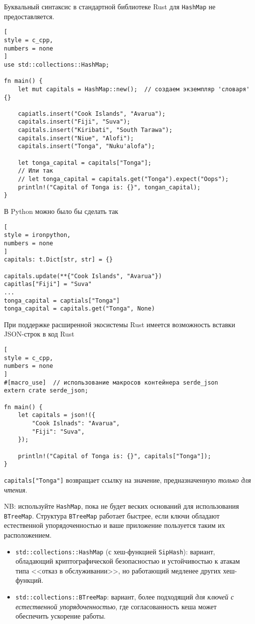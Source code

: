 \documentclass[%
	11pt,
	a4paper,
	utf8,
		]{article}
\begin{document}
Буквальный синтаксис в стандартной библиотеке Rust для \verb|HashMap| не предоставляется. 
\begin{lstlisting}[
style = c_cpp,
numbers = none	
]
use std::collections::HashMap;

fn main() {
    let mut capitals = HashMap::new();  // создаем экземпляр 'словаря' {}
    
    capiatls.insert("Cook Islands", "Avarua");
    capitals.insert("Fiji", "Suva");
    capitals.insert("Kiribati", "South Tarawa");
    capitals.insert("Niue", "Alofi");
    capitals.insert("Tonga", "Nuku'alofa");
    
    let tonga_capital = capitals["Tonga"];
    // Или так
    // let tonga_capital = capitals.get("Tonga").expect("Oops");
    println!("Capital of Tonga is: {}", tongan_capital);
}
\end{lstlisting}

В Python можно было бы сделать так
\begin{lstlisting}[
style = ironpython,
numbers = none
]
capitals: t.Dict[str, str] = {}

capitals.update(**{"Cook Islands", "Avarua"})
capitlas["Fiji"] = "Suva"
...
tonga_capital = captials["Tonga"]
tonga_capital = capitals.get("Tonga", None)
\end{lstlisting}

При поддержке расширенной экосистемы Rust имеется возможность вставки JSON-строк в код Rust
\begin{lstlisting}[
style = c_cpp,
numbers = none
]
#[macro_use]  // использование макросов контейнера serde_json
extern crate serde_json;

fn main() {
    let capitals = json!({
        "Cook Islnads": "Avarua",
        "Fiji": "Suva",
    });

    println!("Capital of Tonga is: {}", capitals["Tonga"]);
}
\end{lstlisting}

\verb|capitals["Tonga"]| возвращает ссылку на значение, предназначенную \emph{только для чтения}.

NB: используйте \verb|HashMap|, пока не будет веских оснований для использования \verb|BTreeMap|. Структура \verb|BTreeMap| работает быстрее, если ключи обладают естественной упорядоченностью и ваше приложение пользуется таким их расположением.

\begin{itemize}
	\item \verb|std::collections::HashMap| (с хеш-функцией \verb|SipHash|): вариант, обладающий криптографической безопасностью и устойчивостью к атакам типа <<отказ в обслуживании>>, но работающий медленее других хеш-функций.
	
	\item \verb|std::collections::BTreeMap|: вариант, более подходящий \emph{для ключей с естественной упорядоченностью}, где согласованность кеша может обеспечить ускорение работы.
\end{itemize}
\end{document}
